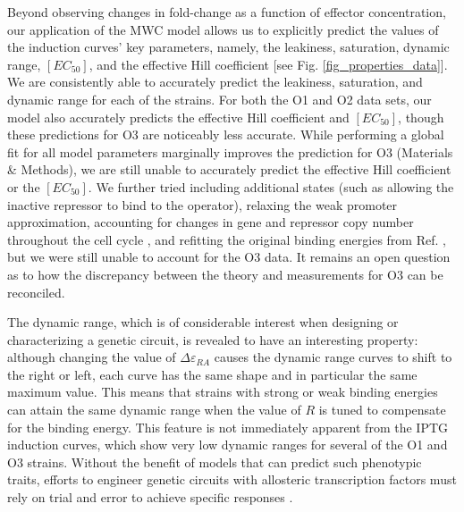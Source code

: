 Beyond observing changes in fold-change as a function of effector concentration,
our application of the MWC model allows us to explicitly predict the values of
the induction curves' key parameters, namely, the leakiness, saturation, dynamic
range, $[EC_{50}]$, and the effective Hill coefficient [see
Fig. \ref{fig_properties_data}]. We are consistently able to accurately predict the
leakiness, saturation, and dynamic range for each of the strains. For both the
O1 and O2 data sets, our model also accurately predicts the effective Hill
coefficient and $[EC_{50}]$, though these predictions for O3 are noticeably less
accurate. While performing a global fit for all model parameters marginally
improves the prediction for O3 (Materials \& Methods), we are still unable to accurately predict
the effective Hill coefficient or the $[EC_{50}]$. We further tried including
additional states (such as allowing the inactive repressor to bind to the
operator), relaxing the weak promoter approximation, accounting for changes in
gene and repressor copy number throughout the cell cycle \cite{Jones2014a}, and
refitting the original binding energies from Ref. \cite{Garcia2011B}, but we were
still unable to account for the O3 data. It remains an open question as to how
the discrepancy between the theory and measurements for O3 can be reconciled.

The dynamic range, which is of considerable interest when designing or
characterizing a genetic circuit, is revealed to have an interesting property:
although changing the value of $\Delta \varepsilon_{RA}$ causes the dynamic
range curves to shift to the right or left, each curve has the same shape and in
particular the same maximum value. This means that strains with strong or weak
binding energies can attain the same dynamic range when the value of $R$ is
tuned to compensate for the binding energy. This feature is not immediately apparent
from the IPTG induction curves, which show very low dynamic ranges for several
of the O1 and O3 strains. Without the benefit of models that can predict such
phenotypic traits, efforts to engineer genetic circuits with allosteric
transcription factors must rely on trial and error to achieve specific responses
\cite{Rogers2015,Rohlhill2017}.

